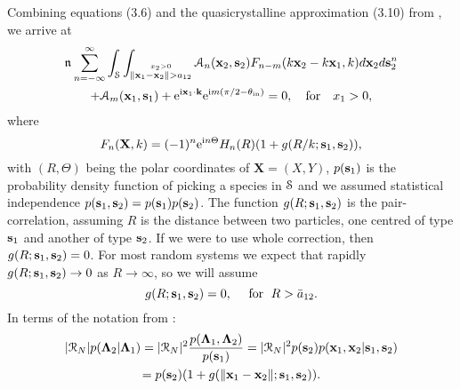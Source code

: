 \documentclass[12pt, a4paper]{article}
\begin{document}
Combining equations (3.6) and the quasicrystalline approximation (3.10) from \parencite{gower_reflection_2018}, we arrive at
\begin{multline}
\mathfrak n_{} \sum_{n=-\infty}^\infty \int_\mathcal S \int_{\stackrel{x_2 > 0 }{\|\mathbf x_1 - \mathbf x_2 \| > a_{12}}}  \mathcal A_n (\mathbf x_2, \mathbf s_2) F_{n-m}(k\mathbf x_2 - k \mathbf x_1,k)  d \mathbf x_2 d\mathbf s_2^n
\\
+  \mathcal A_m (\mathbf x_1, \mathbf s_1) + \textrm{e}^{\textrm{i} \mathbf x_1 \cdot \mathbf k } \textrm{e}^{\textrm{i} m ( \pi/2 - \theta_{\mathrm{in}} )}
   = 0, \quad \text{for} \quad x_1 >0,
  \label{eqn:ensemAsystem}
\end{multline}
where
\begin{equation}
  F_{n}(\mathbf X,k) = (-1)^{n}\textrm{e}^{\textrm{i} n \Theta} H_{n}(R)( 1 + g(R/k;  \mathbf s_1,\mathbf s_2)),
  \label{eqn:integral_kernel}
\end{equation}
with $(R,\Theta)$ being the polar coordinates of $\mathbf X = (X,Y)$,
$p(\mathbf s_1)$ is the probability density function of picking a species in $\mathcal S$ and we assumed statistical independence $p(\mathbf s_1, \mathbf s_2) = p(\mathbf s_1)p(\mathbf s_2)$. The function $g(R; \mathbf s_1,\mathbf s_2)$ is the pair-correlation, assuming $R$ is the distance between two particles, one centred of type $\mathbf s_1$ and another of type $\mathbf s_2$. If we were to use whole correction, then $g(R; \mathbf s_1,\mathbf s_2) = 0$.
For most random systems we expect that rapidly $g(R; \mathbf s_1,\mathbf s_2) \to 0$ as $R \to \infty$, so we will assume
\begin{equation}
  g(R; \mathbf s_1,\mathbf s_2) = 0, \quad \text{ for } \; R > \bar a_{12}.
  \label{eqn:pair_correlation}
\end{equation}
In terms of the notation from \parencite{gower_reflection_2018}:
\begin{multline}
  |\mathcal R_N| p(\boldsymbol{\Lambda}_{2} | \boldsymbol{\Lambda}_{1}) = |\mathcal R_N|^2 \frac{p(\boldsymbol{\Lambda}_{1}, \boldsymbol{\Lambda}_{2})}{p(\mathbf s_1)} = |\mathcal R_N|^2 p(\mathbf s_2) p(\mathbf x_1, \mathbf x_2 | \mathbf s_1,\mathbf s_2)
  \\ = p(\mathbf s_2)(1 + g(\|\mathbf x_1 - \mathbf x_2\|;  \mathbf s_1,\mathbf s_2)).
\end{multline}
\end{document}
